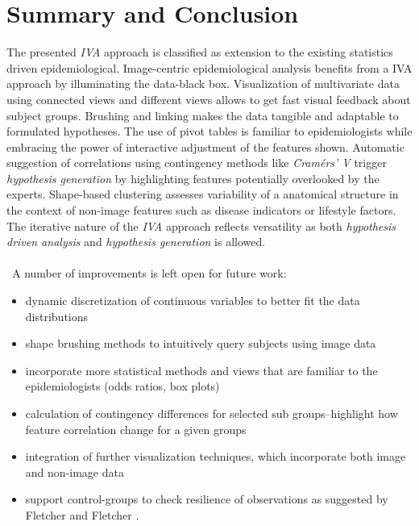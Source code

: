 \documentclass[journal]{style/vgtc} 			          %
\begin{document}
\section{Summary and Conclusion}
The presented \emph{IVA} approach is classified as extension to the existing statistics driven epidemiological.
%
Image-centric epidemiological analysis benefits from a IVA approach by illuminating the data-black box.
%
Visualization of multivariate data using connected views and different views allows to get fast visual feedback about subject groups.
%
Brushing and linking makes the data tangible and adaptable to formulated hypotheses.
%
The use of pivot tables is familiar to epidemiologists while embracing the power of interactive adjustment of the features shown.
%
Automatic suggestion of correlations using contingency methods like \emph{Cram\'{e}rs' V} trigger \emph{hypothesis generation} by highlighting features potentially overlooked by the experts.
%
Shape-based clustering assesses variability of a anatomical structure in the context of non-image features such as disease indicators or lifestyle factors.
%
The iterative nature of the \emph{IVA} approach reflects versatility as both \emph{hypothesis driven analysis} and \emph{hypothesis generation} is allowed.
\\\\\
A number of improvements is left open for future work:
\begin{itemize}
	\item dynamic discretization of continuous variables to better fit the data distributions
	\item shape brushing methods to intuitively query subjects using image data
	\item incorporate more statistical methods and views that are familiar to the epidemiologists (odds ratios, box plots)
	\item calculation of contingency differences for selected sub groups--highlight how feature correlation change for a given groups
	\item integration of further visualization techniques, which incorporate both image and non-image data
	\item support control-groups to check resilience of observations as suggested by Fletcher and Fletcher \cite{Fletcher2012}.
\end{itemize}
\end{document}
